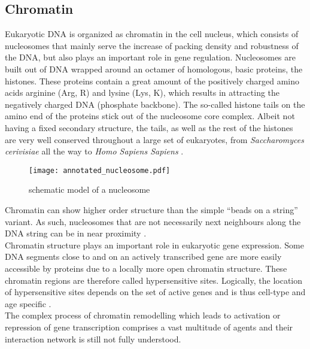         \subsection{Chromatin}
            Eukaryotic DNA is organized as chromatin in the cell nucleus, which consists of nucleosomes that mainly serve the increase of packing density and robustness of the DNA, but also plays an important role in gene regulation. Nucleosomes are built out of DNA wrapped around an octamer of homologous, basic proteins, the histones. These proteins contain a great amount of the positively charged amino acids arginine (Arg, R) and lysine (Lys, K), which results in attracting the negatively charged DNA (phosphate backbone). The so-called histone tails on the amino end of the proteins stick out of the nucleosome core complex. Albeit not having a fixed secondary structure, the tails, as well as the rest of the histones are very well conserved throughout a large set of eukaryotes, from \textit{Saccharomyces cerivisiae} all the way to \textit{Homo Sapiens Sapiens} \cite{berg2015stryer}.\\ %
            \begin{figure}[htpb!]
                \centering
                \texttt{[image: annotated\_nucleosome.pdf]}
                \caption{schematic model of a nucleosome} %
                \label{img:nucleosome}
            \end{figure}
            Chromatin can show higher order structure than the simple “beads on a string” variant. As such, nucleosomes that are not necessarily next neighbours along the DNA string can be in near proximity \cite{berg2015stryer, }.\\ %
            Chromatin structure plays an important role in eukaryotic gene expression. Some DNA segments close to and on an actively transcribed gene are more easily accessible by proteins due to a locally more open chromatin structure. These chromatin regions are therefore called hypersensitive sites. \cite{cooper2017genome} Logically, the location of hypersensitive sites depends on the set of active genes and is thus cell-type and age specific \cite{berg2015stryer}.\\
            The complex process of chromatin remodelling which leads to activation or repression of gene transcription comprises a vast multitude of agents and their interaction network is still not fully understood.\\
